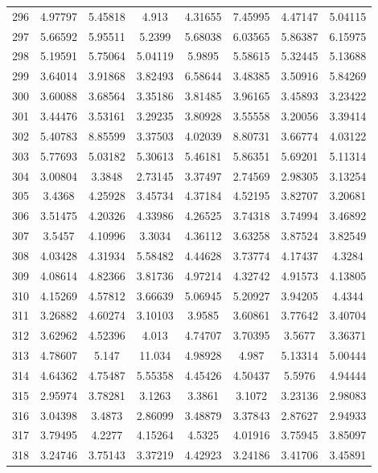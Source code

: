 \begin{figure}
\begin{tabular}{cccccccc}
296 & 4.97797 & 5.45818 & 4.913 & 4.31655 & 7.45995 & 4.47147 & 5.04115\\
297 & 5.66592 & 5.95511 & 5.2399 & 5.68038 & 6.03565 & 5.86387 & 6.15975\\
298 & 5.19591 & 5.75064 & 5.04119 & 5.9895 & 5.58615 & 5.32445 & 5.13688\\
299 & 3.64014 & 3.91868 & 3.82493 & 6.58644 & 3.48385 & 3.50916 & 5.84269\\
300 & 3.60088 & 3.68564 & 3.35186 & 3.81485 & 3.96165 & 3.45893 & 3.23422\\
301 & 3.44476 & 3.53161 & 3.29235 & 3.80928 & 3.55558 & 3.20056 & 3.39414\\
302 & 5.40783 & 8.85599 & 3.37503 & 4.02039 & 8.80731 & 3.66774 & 4.03122\\
303 & 5.77693 & 5.03182 & 5.30613 & 5.46181 & 5.86351 & 5.69201 & 5.11314\\
304 & 3.00804 & 3.3848 & 2.73145 & 3.37497 & 2.74569 & 2.98305 & 3.13254\\
305 & 3.4368 & 4.25928 & 3.45734 & 4.37184 & 4.52195 & 3.82707 & 3.20681\\
306 & 3.51475 & 4.20326 & 4.33986 & 4.26525 & 3.74318 & 3.74994 & 3.46892\\
307 & 3.5457 & 4.10996 & 3.3034 & 4.36112 & 3.63258 & 3.87524 & 3.82549\\
308 & 4.03428 & 4.31934 & 5.58482 & 4.44628 & 3.73774 & 4.17437 & 4.3284\\
309 & 4.08614 & 4.82366 & 3.81736 & 4.97214 & 4.32742 & 4.91573 & 4.13805\\
310 & 4.15269 & 4.57812 & 3.66639 & 5.06945 & 5.20927 & 3.94205 & 4.4344\\
311 & 3.26882 & 4.60274 & 3.10103 & 3.9585 & 3.60861 & 3.77642 & 3.40704\\
312 & 3.62962 & 4.52396 & 4.013 & 4.74707 & 3.70395 & 3.5677 & 3.36371\\
313 & 4.78607 & 5.147 & 11.034 & 4.98928 & 4.987 & 5.13314 & 5.00444\\
314 & 4.64362 & 4.75487 & 5.55358 & 4.45426 & 4.50437 & 5.5976 & 4.94444\\
315 & 2.95974 & 3.78281 & 3.1263 & 3.3861 & 3.1072 & 3.23136 & 2.98083\\
316 & 3.04398 & 3.4873 & 2.86099 & 3.48879 & 3.37843 & 2.87627 & 2.94933\\
317 & 3.79495 & 4.2277 & 4.15264 & 4.5325 & 4.01916 & 3.75945 & 3.85097\\
318 & 3.24746 & 3.75143 & 3.37219 & 4.42923 & 3.24186 & 3.41706 & 3.45891\\

\end{tabular}
\end{figure}
